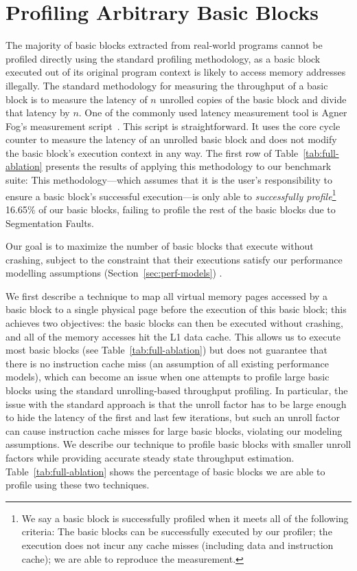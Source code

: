 \section{Profiling Arbitrary Basic Blocks}
The majority of basic blocks extracted from real-world programs cannot be profiled directly 
using the standard profiling methodology,
as a basic block executed out of its original program context is likely to access memory addresses illegally.
The standard methodology for measuring the throughput of a basic block
is to measure the latency of $n$ unrolled copies of the basic block
and divide that latency by $n$.
One of the commonly used latency measurement tool is Agner Fog's measurement script~\cite{agner}.
This script is straightforward. 
It uses the core cycle counter to measure the latency of an unrolled basic block and
does not modify the basic block's execution context in any way.
The first row of Table~\ref{tab:full-ablation} presents the results of applying
this methodology to our benchmark suite: 
This methodology---which assumes that it is the user's responsibility to ensure a basic block's successful execution---is only able to {\em successfully profile}\footnote{
We say a basic block is successfully profiled when it meets all of the following criteria:
The basic blocks can be successfully executed by our profiler;
the execution does not incur any cache misses (including data and instruction cache);
we are able to reproduce the measurement.
} 16.65\% of our basic blocks, failing to profile the rest of the basic 
blocks due to Segmentation Faults.

Our goal is to maximize the number of basic blocks that execute without crashing, subject to the constraint that their executions satisfy our performance modelling assumptions (Section~\ref{sec:perf-models}) .

We first describe a technique to map all virtual memory pages accessed by a basic block
to a single physical page before the execution of this basic block;
this achieves two objectives: the basic blocks can then be executed without crashing,
and all of the memory accesses hit the L1 data cache.
This allows us to execute most basic blocks (see Table~\ref{tab:full-ablation})
but does not guarantee that there is no instruction cache
miss (an assumption of all existing performance models),
which can become an issue when one attempts to profile large basic blocks using
the standard unrolling-based throughput profiling.
In particular, the issue with the standard approach is that the unroll factor
has to be large enough to hide the latency of the first and last few iterations,
but such an unroll factor can cause instruction cache misses for large basic blocks,
violating our modeling assumptions.
We describe our technique to profile basic blocks with smaller
unroll factors while providing accurate steady state throughput estimation.
Table~\ref{tab:full-ablation} shows the percentage of basic blocks
we are able to profile using these two techniques.

